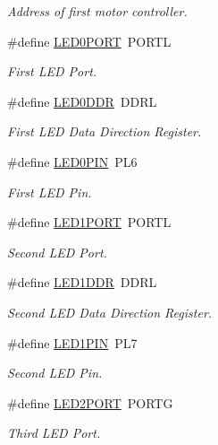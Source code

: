 \begin{DoxyCompactItemize}
\begin{DoxyCompactList}\small\item\em Address of first motor controller. \end{DoxyCompactList}\item 
\#define \hyperlink{group__config_gac0f99671c3447a31e5d3755e1f11ee1f}{L\-E\-D0\-P\-O\-R\-T}~P\-O\-R\-T\-L
\begin{DoxyCompactList}\small\item\em First L\-E\-D Port. \end{DoxyCompactList}\item 
\#define \hyperlink{group__config_ga86208659221ec2a932cd722dfc18101f}{L\-E\-D0\-D\-D\-R}~D\-D\-R\-L
\begin{DoxyCompactList}\small\item\em First L\-E\-D Data Direction Register. \end{DoxyCompactList}\item 
\#define \hyperlink{group__config_gab0e1f692e2b1fa1cdbb24a9926b3489d}{L\-E\-D0\-P\-I\-N}~P\-L6
\begin{DoxyCompactList}\small\item\em First L\-E\-D Pin. \end{DoxyCompactList}\item 
\#define \hyperlink{group__config_ga3931891a757b08dbdfeaa8afd4dcb664}{L\-E\-D1\-P\-O\-R\-T}~P\-O\-R\-T\-L
\begin{DoxyCompactList}\small\item\em Second L\-E\-D Port. \end{DoxyCompactList}\item 
\#define \hyperlink{group__config_gab0f33b52cdb68e643eba6cf583fb625f}{L\-E\-D1\-D\-D\-R}~D\-D\-R\-L
\begin{DoxyCompactList}\small\item\em Second L\-E\-D Data Direction Register. \end{DoxyCompactList}\item 
\#define \hyperlink{group__config_ga04d7aaffbb7b5afaf49acf8a3a39e33a}{L\-E\-D1\-P\-I\-N}~P\-L7
\begin{DoxyCompactList}\small\item\em Second L\-E\-D Pin. \end{DoxyCompactList}\item 
\#define \hyperlink{group__config_ga4b6e8cddebfbc6f1f5132eb93b92d60f}{L\-E\-D2\-P\-O\-R\-T}~P\-O\-R\-T\-G
\begin{DoxyCompactList}\small\item\em Third L\-E\-D Port. \end{DoxyCompactList}\item 

\end{DoxyCompactItemize}
